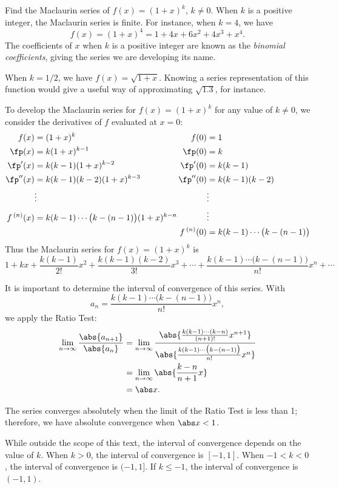 \begin{example}\label{ex_ts4}
Find the Maclaurin series of $f(x) = (1+x)^k$, $k\neq 0$.
\solution
When $k$ is a positive integer, the Maclaurin series is finite. For instance, when $k=4$, we have 
\[f(x) = (1+x)^4 = 1+4x+6x^2+4x^3+x^4.\]
The coefficients of $x$ when $k$ is a positive integer are known as the \emph{binomial coefficients}, giving the series we are developing its name.

When $k=1/2$, we have $f(x) = \sqrt{1+x}$. Knowing a series representation of this function would give a useful way of approximating $\sqrt{1.3}$, for instance.

To develop the Maclaurin series for $f(x) = (1+x)^k$ for any value of $k\neq0$, we consider the derivatives of $f$ evaluated at $x=0$:
{%
\small%
\begin{align*}
f(x) &= (1+x)^k & f(0) &= 1\\
\fp(x) &= k(1+x)^{k-1} & \fp(0) &=k\\
\fp'(x) &= k(k-1)(1+x)^{k-2} & \fp'(0) &=k(k-1)\\
\fp''(x) &= k(k-1)(k-2)(1+x)^{k-3} & \fp''(0) &=k(k-1)(k-2)\\
&\vdots & &\vdots\\
f\,^{(n)}(x) &= k(k-1)\dotsm\bigl(k-(n-1)\bigr)(1+x)^{k-n}
\mkern-3\thickmuskip&&\vdots \\
&& f\,^{(n)}(0) &=k(k-1)\dotsm\bigl(k-(n-1)\bigr)
\end{align*}}%
Thus the Maclaurin series for $f(x) = (1+x)^k$ is
\[
1+ kx + \frac{k(k-1)}{2!}x^2 + \frac{k(k-1)(k-2)}{3!}x^3 + \dotsb + \frac{k(k-1)\dotsm\bigl(k-(n-1)\bigr)}{n!}x^n+\dotsb
\]

It is important to determine the interval of convergence of this series. With 
\[a_n = \frac{k(k-1)\dotsm\bigl(k-(n-1)\bigr)}{n!}x^n,\]
we apply the Ratio Test:
\begin{align*}
	\lim_{n\to\infty}\frac{\abs{a_{n+1}}}{\abs{a_n}}
	&=\lim_{n\to\infty}\frac{\abs{\frac{k(k-1)\dotsm(k-n)}{(n+1)!}x^{n+1}}}{\abs{\frac{k(k-1)\dotsm\bigl(k-(n-1)\bigr)}{n!}x^n}}\\
		&=\lim_{n\to\infty} \abs{\frac{k-n}{n+1}x}\\
		&= \abs x.
\end{align*}

The series converges absolutely when the limit of the Ratio Test is less than 1; therefore, we have absolute convergence when $\abs x<1$. 

While outside the scope of this text, the interval of convergence depends on the value of $k$. When $k>0$, the interval of convergence is $[-1,1]$. When $-1<k<0$, the interval of convergence is $(-1,1]$. If $k\leq -1$, the interval of convergence is $(-1,1)$.
\end{example}

